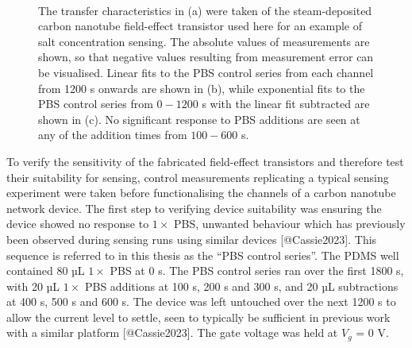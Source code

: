 \documentclass[
  letterpaper,
  DIV=11,
  numbers=noendperiod]{scrartcl}
\begin{document}
\begin{figure}
\begin{minipage}[t]{0.70\linewidth}
{{}

}

\end{minipage}%
%
\begin{minipage}[t]{0.15\linewidth}

{\centering 

~

}

\end{minipage}%

\caption{\label{fig-salt-conc-control-series}The transfer
characteristics in (a) were taken of the steam-deposited carbon nanotube
field-effect transistor used here for an example of salt concentration
sensing. The absolute values of measurements are shown, so that negative
values resulting from measurement error can be visualised. Linear fits
to the PBS control series from each channel from 1200 s onwards are
shown in (b), while exponential fits to the PBS control series from
\(0-1200\) s with the linear fit subtracted are shown in (c). No
significant response to PBS additions are seen at any of the addition
times from \(100-600\) s.}

\end{figure}

To verify the sensitivity of the fabricated field-effect transistors and
therefore test their suitability for sensing, control measurements
replicating a typical sensing experiment were taken before
functionalising the channels of a carbon nanotube network device. The
first step to verifying device suitability was ensuring the device
showed no response to \(1 \times\) PBS, unwanted behaviour which has
previously been observed during sensing runs using similar devices
{[}@Cassie2023{]}. This sequence is referred to in this thesis as the
``PBS control series''. The PDMS well contained 80 µL \(1 \times\) PBS
at 0 s. The PBS control series ran over the first 1800 s, with 20 µL
\(1 \times\) PBS additions at 100 s, 200 s and 300 s, and 20 µL
subtractions at 400 s, 500 s and 600 s. The device was left untouched
over the next 1200 s to allow the current level to settle, seen to
typically be sufficient in previous work with a similar platform
{[}@Cassie2023{]}. The gate voltage was held at \(V_g\) = 0 V.
\end{document}
